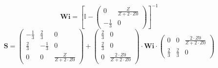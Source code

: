 \[ \mathbf{Wi} =  \left[ \mathbb{I}  - \left(\begin{array}{cc} 0 & \frac{Z}{Z+2\cdot Z0} \\ -\frac{1}{3} & 0 \end{array}\right) \right]^{-1}  \]
\[ \mathbf{S} = \left(\begin{array}{ccc} -\frac{1}{3} & \frac{2}{3} & 0 \\ \frac{2}{3} & -\frac{1}{3} & 0 \\ 0 & 0 & \frac{Z}{Z+2\cdot Z0} \end{array}\right) + \left(\begin{array}{cc} \frac{2}{3} & 0 \\ \frac{2}{3} & 0 \\ 0 & \frac{2\cdot Z0}{Z+2\cdot Z0} \end{array}\right) \cdot \mathbf{Wi} \cdot\left(\begin{array}{ccc} 0 & 0 & \frac{2\cdot Z0}{Z+2\cdot Z0} \\ \frac{2}{3} & \frac{2}{3} & 0 \end{array}\right) \]
